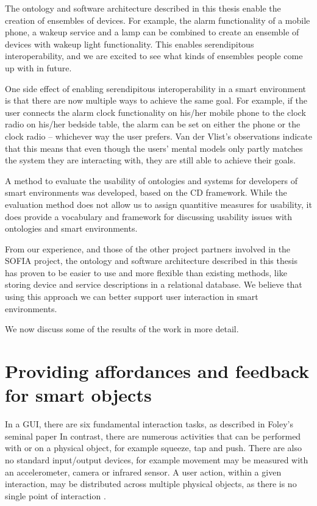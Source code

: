 The ontology and software architecture described in this thesis enable the creation of ensembles of devices. For example, the alarm functionality of a mobile phone, a wakeup service and a lamp can be combined to create an ensemble of devices with wakeup light functionality. This enables serendipitous interoperability, and we are excited to see what kinds of ensembles people come up with in future.

One side effect of enabling serendipitous interoperability in a smart environment is that there are now multiple ways to achieve the same goal. For example, if the user connects the alarm clock functionality on his/her mobile phone to the clock radio on his/her bedside table, the alarm can be set on either the phone or the clock radio -- whichever way the user prefers. Van der Vlist's \cite{Bram} observations indicate that this means that even though the users' mental models only partly matches the system they are interacting with, they are still able to achieve their goals.

A method to evaluate the usability of ontologies and systems for developers of smart environments was developed, based on the \ac{CD} framework. While the evaluation method does not allow us to assign quantitive measures for usability, it does provide a vocabulary and framework for discussing usability issues with ontologies and smart environments.%

From our experience, and those of the other project partners involved in the \ac{SOFIA} project, the ontology and software architecture described in this thesis has proven to be easier to use and more flexible than existing methods, like  storing device and service descriptions in a relational database. We believe that using this approach we can better support user interaction in smart environments.

We now discuss some of the results of the work in more detail.

\section{Providing affordances and feedback for smart objects}

In a \ac{GUI}, there are six fundamental interaction tasks, as described in Foley's seminal paper \cite{Foley1984} In contrast, there are numerous activities that can be performed with or on a physical object, for example squeeze, tap and push. There are also no standard input/output devices, for example movement may be measured with an accelerometer, camera or infrared sensor. A user action, within a given interaction, may be distributed across multiple physical objects, as there is no single point of interaction \cite{Dourish2004}. 

